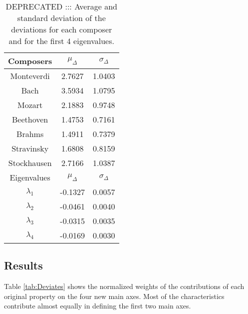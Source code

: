 \documentclass[
 aip,
 jmp,
 amsmath,amssymb,
 reprint,
]{revtex4-1}
\begin{document}
\begin{table}%
\caption{\label{tab:tableD}DEPRECATED ::: Average and standard deviation of the 
deviations for each composer and for the first 
4 eigenvalues.}

\begin{tabular}{|c||c|c|}
\hline

Composers & $\mu_{\Delta}$ & $\sigma_{\Delta}$ \\
\hline

Monteverdi     & 2.7627 & 1.0403 \\
Bach           & 3.5934 & 1.0795 \\
Mozart         & 2.1883 & 0.9748 \\
Beethoven      & 1.4753 & 0.7161 \\
Brahms         & 1.4911 & 0.7379 \\
Stravinsky     & 1.6808 & 0.8159 \\
Stockhausen    & 2.7166 & 1.0387 \\
\hline \hline
Eigenvalues & $\mu_{\Delta}$ & $\sigma_{\Delta}$ \\
\hline
$\lambda_1$ &  -0.1327 & 0.0057 \\
$\lambda_2$ &  -0.0461 & 0.0040 \\
$\lambda_3$ &  -0.0315 & 0.0035 \\
$\lambda_4$ &  -0.0169 & 0.0030 \\
\hline

\end{tabular}
\end{table}

\subsection{Results}

Table \ref{tab:Deviates} shows the normalized weights
of the contributions of each original property on the four
new main axes. Most of the characteristics contribute almost equally
in defining the first two main axes.
\end{document}
